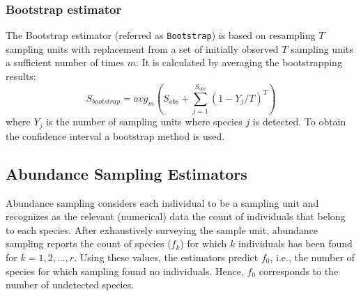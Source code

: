 \documentclass[sigconf,review,anonymous]{acmart}
\newcommand{\Bootstrap}{Bootstrap\xspace}
\newcounter{todocounter}
\newcommand{\todo}[1]{\marginpar{$|$}\textcolor{red}{\stepcounter{todocounter}\footnote[\thetodocounter]{\textcolor{red}{\textbf{TODO }}\textit{#1}}}}
\def\<#1>{\texttt{#1}}
\renewcommand{\todo}[1]{}
\begin{document}
\subsubsection{Bootstrap estimator~\cite{smith1984nonparametric}} %
The \Bootstrap estimator (referred as \<Bootstrap>) is based on resampling $T$ sampling units with replacement from a set of
initially observed $T$ sampling units a sufficient number of times $m$.
It is calculated by averaging the bootstrapping results:
\begin{displaymath}
S_{bootstrap}  = {avg}_{m}( S_{obs} + \sum^{S_{obs}}_{j=1} (1 - Y_j/T)^T)
\end{displaymath}
where $Y_{j}$ is the number of sampling units %
where species $j$ is detected.%
To obtain the confidence interval a bootstrap method is used.



\subsection{Abundance Sampling Estimators}
\label{sec:estimators-abundance}
Abundance sampling considers each individual to be a sampling unit
and recognizes as the relevant (numerical) data the count of individuals
that belong to each species.
After exhaustively surveying the sample unit, abundance sampling reports
the count of species ($f_k$) for which $k$ individuals has been
found for $k=1,2,\ldots, r$.
%
Using these values, the estimators predict $f_0$, i.e., the number of species
for which sampling found no individuals. Hence, $f_0$ corresponds to the
number of undetected species.
\end{document}
